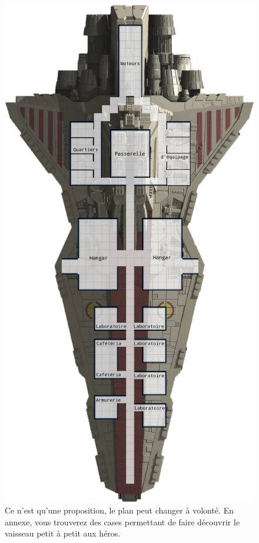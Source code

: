 \begin{figure}[!h]
	\centering
	\includegraphics[height=0.87\textheight]{_img/dos-au-muur/venator-plan.png}
	\caption{Ce n’est qu’une proposition, le plan peut changer à volonté. En annexe, vous trouverez des cases permettant de faire découvrir le vaisseau petit à petit aux héros.}
\end{figure}

\twocolumn
